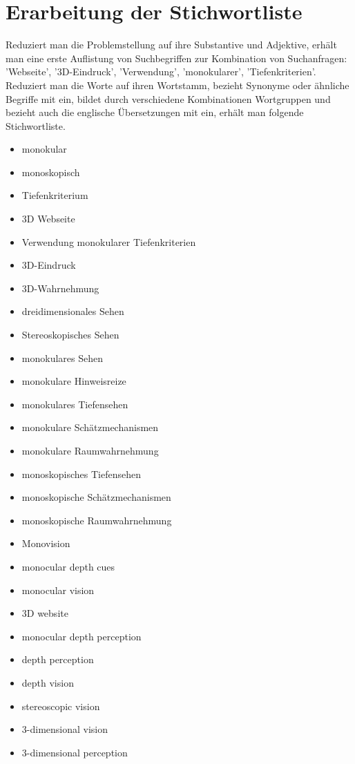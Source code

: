 \section{Erarbeitung der Stichwortliste}
Reduziert man die Problemstellung auf ihre Substantive und Adjektive, erhält man eine erste Auflistung von Suchbegriffen zur Kombination von Suchanfragen: 'Webseite', '3D-Eindruck', 'Verwendung', 'monokularer', 'Tiefenkriterien'. Reduziert man die Worte auf ihren Wortstamm, bezieht Synonyme oder ähnliche Begriffe mit ein, bildet durch verschiedene Kombinationen Wortgruppen und bezieht auch die englische Übersetzungen mit ein, erhält man folgende Stichwortliste.
\begin{itemize}
\item monokular
\item monoskopisch
\item Tiefenkriterium
\item 3D Webseite
\item Verwendung monokularer Tiefenkriterien
\item 3D-Eindruck
\item 3D-Wahrnehmung
\item dreidimensionales Sehen
\item Stereoskopisches Sehen
\item monokulares Sehen
\item monokulare Hinweisreize
\item monokulares Tiefensehen
\item monokulare Schätzmechanismen
\item monokulare Raumwahrnehmung
\item monoskopisches Tiefensehen
\item monoskopische Schätzmechanismen
\item monoskopische Raumwahrnehmung
\item Monovision
\item monocular depth cues
\item monocular vision
\item 3D website
\item monocular depth perception
\item depth perception
\item depth vision
\item stereoscopic vision
\item 3-dimensional vision
\item 3-dimensional perception
\end{itemize}

